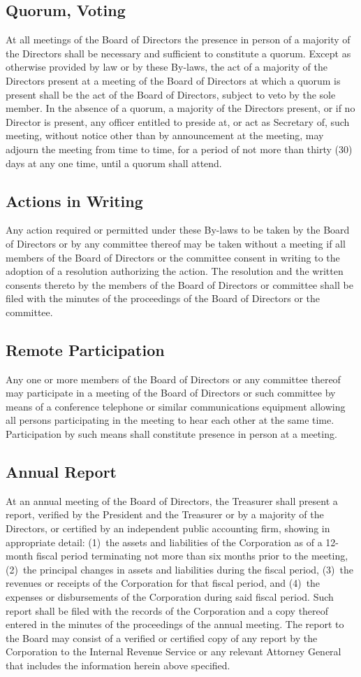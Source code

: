 \documentclass{article}
\begin{document}
\subsection{Quorum, Voting}
At all meetings of the Board of Directors the presence in person of a majority of the Directors shall be necessary and sufficient to constitute a quorum.  Except as otherwise provided by law or by these By-laws, the act of a majority of the Directors present at a meeting of the Board of Directors at which a quorum is present shall be the act of the Board of Directors, subject to veto by the sole member.  In the absence of a quorum, a majority of the Directors present, or if no Director is present, any officer entitled to preside at, or act as Secretary of, such meeting, without notice other than by announcement at the meeting, may adjourn the meeting from time to time, for a period of not more than thirty (30) days at any one time, until a quorum shall attend.
\subsection{Actions in Writing}
 Any action required or permitted under these By-laws to be taken by the Board of Directors or by any committee thereof may be taken without a meeting if all members of the Board of Directors or the committee consent in writing to the adoption of a resolution authorizing the action.  The resolution and the written consents thereto by the members of the Board of Directors or committee shall be filed with the minutes of the proceedings of the Board of Directors or the committee.
\subsection{Remote Participation}
Any one or more members of the Board of Directors or any committee thereof may participate in a meeting of the Board of Directors or such committee by means of a conference telephone or similar communications equipment allowing all persons participating in the meeting to hear each other at the same time.  Participation by such means shall constitute presence in person at a meeting.
\subsection{Annual Report}
At an annual meeting of the Board of Directors, the Treasurer shall present a report, verified by the President and the Treasurer or by a majority of the Directors, or certified by an independent public accounting firm, showing in appropriate detail:  (1) the assets and liabilities of the Corporation as of a 12-month fiscal period terminating not more than six months prior to the meeting, (2) the principal changes in assets and liabilities during the fiscal period, (3) the revenues or receipts of the Corporation for that fiscal period, and (4) the expenses or disbursements of the Corporation during said fiscal period.  Such report shall be filed with the records of the Corporation and a copy thereof entered in the minutes of the proceedings of the annual meeting.  The report to the Board may consist of a verified or certified copy of any report by the Corporation to the Internal Revenue Service or any relevant Attorney General that includes the information herein above specified.
\end{document}
